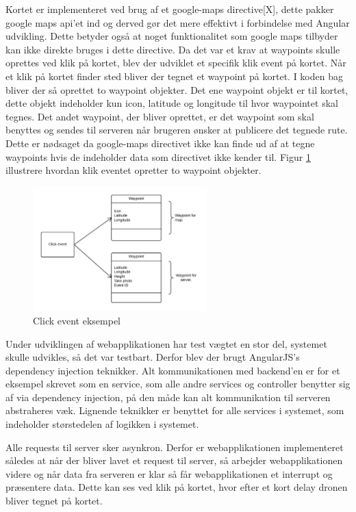 Kortet er implementeret ved brug af et google-maps directive[X], dette pakker google maps api'et ind og derved gør det mere effektivt i forbindelse med Angular udvikling. Dette betyder også at noget funktionalitet som google maps tilbyder kan ikke direkte bruges i dette directive. 
Da det var et krav at waypoints skulle oprettes ved klik på kortet, blev der udviklet et specifik klik event på kortet. Når et klik på kortet finder sted bliver der tegnet et waypoint på kortet. I koden bag bliver der så oprettet to waypoint objekter. Det ene waypoint objekt er til kortet, dette objekt indeholder kun icon, latitude og longitude til hvor waypointet skal tegnes. Det andet waypoint, der bliver oprettet, er det waypoint som skal benyttes og sendes til serveren når brugeren ønsker at publicere det tegnede rute. Dette er nødsaget da google-maps directivet ikke kan finde ud af at tegne waypoints hvis de indeholder data som directivet ikke kender til. Figur \ref{fig:click_event} illustrere hvordan klik eventet opretter to waypoint objekter.

\vspace{-5pt}
\begin{figure}[H]
	\centering
	\includegraphics[width=0.6\textwidth]{Billeder/click_event.png}
	\vspace{-5pt}
	\caption{Click event eksempel}
	\label{fig:click_event}
\end{figure}


Under udviklingen af webapplikationen har test vægtet en stor del, systemet skulle udvikles, så det var testbart. Derfor blev der brugt AngularJS's dependency injection teknikker. Alt kommunikationen med backend'en er for et eksempel skrevet som en service, som alle andre services og controller benytter sig af via dependency injection, på den måde kan alt kommunikation til serveren abstraheres væk. Lignende teknikker er benyttet for alle services i systemet, som indeholder størstedelen af logikken i systemet.  

Alle requests til server sker asynkron. Derfor er webapplikationen implementeret således at når der bliver lavet et request til server, så arbejder webapplikationen videre og når data fra serveren er klar så får webapplikationen et interrupt og præsentere data. Dette kan ses ved klik på kortet, hvor efter et kort delay dronen bliver tegnet på kortet.

